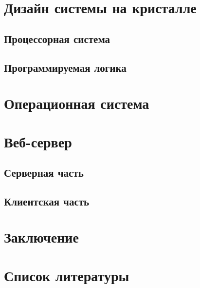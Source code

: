 \documentclass[a4paper, 12pt]{article}
\begin{document}
\section{Дизайн системы на кристалле}
    \subsection{Процессорная система}
    
    \subsection{Программируемая логика}
    

\section{Операционная система}

\section{Веб-сервер}
    \subsection{Серверная часть}
    
    \subsection{Клиентская часть}
    

\section{Заключение}

\section{Список литературы}
\end{document}
